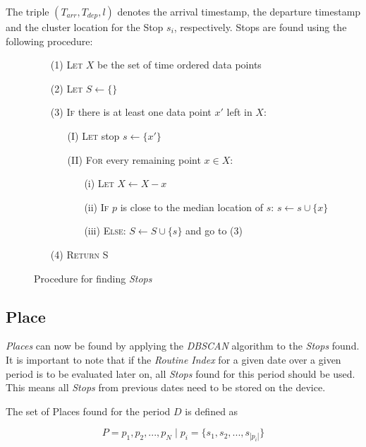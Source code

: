 The triple $(T_{arr}, T_{dep}, l)$ denotes the arrival timestamp, the departure timestamp and the cluster location for the Stop $s_i$, respectively. Stops are found using the following procedure:

\begin{figure}[h]
    \centering
    \begin{itemize}
        \item[(1)] \textsc{Let} $X$ be the set of time ordered data points
        \item[(2)] \textsc{Let} $S \leftarrow \{ \}$
        \item[(3)] \textsc{If} there is at least one data point $x'$ left in $X$:
            \begin{itemize}
                \item[(I)] \textsc{Let} stop $s \leftarrow \{ x' \}$
            \item[(II)] \textsc{For} every remaining point $x \in X$:
            \begin{itemize}
                \item[(i)] \textsc{Let} $X \leftarrow X - x$
                \item[(ii)] \textsc{If} $p$ is close to the median location of $s$: $s \leftarrow s \cup \{ x \}$
                \item[(iii)] \textsc{Else}: $S \leftarrow S \cup \{ s \}$ and go to \textsc{(3)}
            \end{itemize}
            \end{itemize}
        \item[(4)] \textsc{Return} S
    \end{itemize} 
    \caption{Procedure for finding \textit{Stops}}
    \label{fig:find_stops}
\end{figure}

\subsection{Place}
\textit{Places} can now be found by applying the \textit{DBSCAN} algorithm to the \textit{Stops} found. It is important to note that if the \textit{Routine Index} for a given date over a given period is to be evaluated later on, all \textit{Stops} found for this period should be used. This means all \textit{Stops} from previous dates need to be stored on the device. 

The set of Places found for the period $D$ is defined as 

\begin{equation}
\label{eq:feature-places}
P = {p_1, p_2, ..., p_N} \;|\; p_i = \{s_1, s_2, ..., s_{|p_i|}\}
\end{equation}

